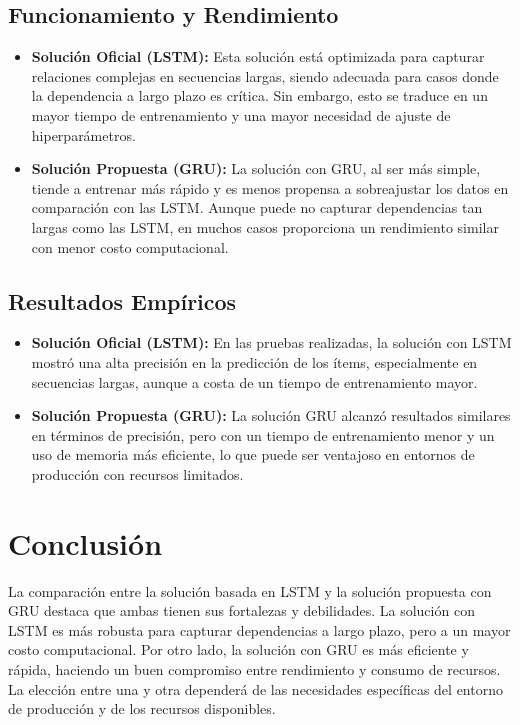 \documentclass[runningheads]{llncs}
\begin{document}
\subsection{Funcionamiento y Rendimiento}

\begin{itemize}
    \item \textbf{Solución Oficial (LSTM):} Esta solución está optimizada para capturar relaciones complejas en secuencias largas, siendo adecuada para casos donde la dependencia a largo plazo es crítica. Sin embargo, esto se traduce en un mayor tiempo de entrenamiento y una mayor necesidad de ajuste de hiperparámetros.
    
    \item \textbf{Solución Propuesta (GRU):} La solución con GRU, al ser más simple, tiende a entrenar más rápido y es menos propensa a sobreajustar los datos en comparación con las LSTM. Aunque puede no capturar dependencias tan largas como las LSTM, en muchos casos proporciona un rendimiento similar con menor costo computacional.
\end{itemize}

\subsection{Resultados Empíricos}

\begin{itemize}
    \item \textbf{Solución Oficial (LSTM):} En las pruebas realizadas, la solución con LSTM mostró una alta precisión en la predicción de los ítems, especialmente en secuencias largas, aunque a costa de un tiempo de entrenamiento mayor.
    
    \item \textbf{Solución Propuesta (GRU):} La solución GRU alcanzó resultados similares en términos de precisión, pero con un tiempo de entrenamiento menor y un uso de memoria más eficiente, lo que puede ser ventajoso en entornos de producción con recursos limitados.
\end{itemize}

\section{Conclusión}

La comparación entre la solución basada en LSTM y la solución propuesta con GRU destaca que ambas tienen sus fortalezas y debilidades. La solución con LSTM es más robusta para capturar dependencias a largo plazo, pero a un mayor costo computacional. Por otro lado, la solución con GRU es más eficiente y rápida, haciendo un buen compromiso entre rendimiento y consumo de recursos. La elección entre una y otra dependerá de las necesidades específicas del entorno de producción y de los recursos disponibles.
\end{document}
